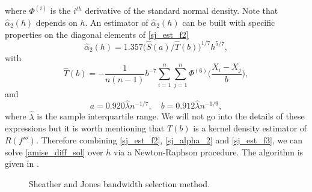 where $\Phi^{(i)}$ is the $i^{th}$ derivative of the standard normal density. Note that $\hat\alpha_2(h)$ depends on $h$. An estimator of $\hat\alpha_2(h)$ can be built with specific properties on the diagonal elements of \cref{sj_est_f2}
\begin{equation}
\label{sj_alpha_2}
    \hat\alpha_2(h) = 1.357\big(\hat S(a)/\hat T(b)\big)^{1/7}h^{5/7},
\end{equation}
with
\begin{equation}
\label{sj_est_f3}
    \hat T(b) = -\frac{1}{n(n-1)}b^{-7}\sum_{i=1}^n\sum_{j=1}^n\Phi^{(6)}\Big(\frac{X_i-X_j}{b}\Big),
\end{equation}
and 
\begin{equation}
    a = 0.920\hat\lambda n^{-1/7}, \quad b= 0.912\hat\lambda n^{-1/9},
\end{equation}
where $\hat\lambda$ is the sample interquartile range. We will not go into the details of these expressions but it is worth mentioning that $\hat T(b)$ is a kernel density estimator of $R(f''')$. Therefore combining \cref{sj_est_f2}, \cref{sj_alpha_2} and \cref{sj_est_f3}, we can solve \cref{amise_diff_sol} over $h$ via a Newton-Raphson procedure. The algorithm is given in .

\begin{figure}[H]
\begin{center}
   \caption{Sheather and Jones bandwidth selection method.}
   \label{algo:sj_method}
\end{center}
\end{figure}
